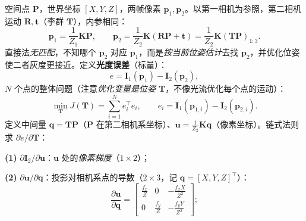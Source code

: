 \begin{derivation}
\label{thm:vo-direct}
空间点 $\mathbf{P}$，世界坐标 $[X,Y,Z]$，两帧像素 $\mathbf{p}_1,\mathbf{p}_2$。以第一相机为参照，第二相机运动 $\mathbf{R},\mathbf{t}$（李群 $\mathbf{T}$），内参相同\cite{gaoxiang2019slam14}：
\begin{equation}
  \mathbf{p}_1=\frac1{Z_1}\mathbf{K}\mathbf{P},\qquad
  \mathbf{p}_2=\frac1{Z_2}\mathbf{K}(\mathbf{R}\mathbf{P}+\mathbf{t})=\frac1{Z_2}\mathbf{K}(\mathbf{T}\mathbf{P})_{1:3}.
  \label{eq:vo-direct-proj}
\end{equation}
直接法\emph{无匹配}，不知哪个 $\mathbf{p}_2$ 对应 $\mathbf{p}_1$，而是\emph{按当前位姿估计}去找 $\mathbf{p}_2$，并优化位姿使二者灰度更接近。定义\textbf{光度误差}（标量）：
\begin{equation}
  e=\mathbf{I}_1(\mathbf{p}_1)-\mathbf{I}_2(\mathbf{p}_2),
  \label{eq:vo-photo-err}
\end{equation}
$N$ 个点的整体问题（注意\emph{优化变量是位姿 $\mathbf{T}$}，不像光流优化每个点的运动）：
\begin{equation}
  \min_{\mathbf{T}}J(\mathbf{T})=\sum_{i=1}^{N}e_i^\top e_i,\qquad e_i=\mathbf{I}_1(\mathbf{p}_{1,i})-\mathbf{I}_2(\mathbf{p}_{2,i}).
  \label{eq:vo-photo-cost}
\end{equation}
定义中间量 $\mathbf{q}=\mathbf{T}\mathbf{P}$（$\mathbf{P}$ 在第二相机系坐标）、$\mathbf{u}=\tfrac1{Z_2}\mathbf{K}\mathbf{q}$（像素坐标）。链式法则求 $\partial e/\partial\mathbf{T}$：

\textbf{(1)} $\partial\mathbf{I}_2/\partial\mathbf{u}$：$\mathbf{u}$ 处的\emph{像素梯度}（$1\times2$）；

\textbf{(2)} $\partial\mathbf{u}/\partial\mathbf{q}$：投影对相机系点的导数（$2\times3$，记 $\mathbf{q}=[X,Y,Z]^\top$）：
\begin{equation}
  \frac{\partial\mathbf{u}}{\partial\mathbf{q}}=\begin{bmatrix}\frac{f_x}{Z}&0&-\frac{f_xX}{Z^2}\\0&\frac{f_y}{Z}&-\frac{f_yY}{Z^2}\end{bmatrix};
  \label{eq:vo-direct-duq}
\end{equation}


\end{derivation}
